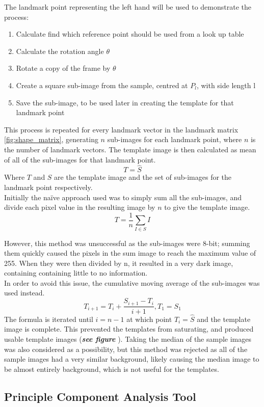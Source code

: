 \documentclass[a4paper, 12pt]{article}
\begin{document}
	The landmark point representing the left hand will be used to demonstrate the process:
	\begin{enumerate}
		\item Calculate find which reference point should be used from a look up table
		\item Calculate the rotation angle $\theta$
		\item Rotate a copy of the frame by $\theta$
		\item Create a square sub-image from the sample, centred at $P_l$, with side length l
		\item Save the sub-image, to be used later in creating the template for that landmark point
	\end{enumerate}
	This process is repeated for every landmark vector in the landmark matrix \ref{fig:shape_matrix}, generating $n$ sub-images
	for each landmark point, where $n$ is the number of landmark vectors.
	The template image is then calculated as mean of all of the sub-images for that landmark point.
	$$T = \hat{S}$$
 	Where $T$ and $S$ are the template image and the set of sub-images for the landmark point respectively.\\	
	Initially the naïve approach used was to simply sum all the sub-images, and divide each pixel value 
	in the resulting image by $n$ to give the template image.
	$$T = \frac{1}{n}\sum_{I \in S} I$$

	However, this method was unsuccessful as the sub-images were 8-bit; summing them quickly caused the pixels
	in the sum image to reach the maximum value of 255.
	When they were then divided by n, it resulted in a very dark image, containing containing little to no information.\\
	In order to avoid this issue, the cumulative moving average of the sub-images was used instead.
	$$T_{i+1} = T_i + \frac{S_{i+1} - T_i}{i+1}, T_1 = S_1$$
	The formula is iterated until $i = n-1$ at which point $T_i=\hat{S}$ and the template image is complete.
	This prevented the templates from saturating, and produced usable template images (\textbf{\emph{see figure }}).
	Taking the median of the sample images was also considered as a possibility, but this method
	was rejected as all of the sample images had a very similar background, likely causing
	the median image to be almost entirely background, which is not useful for the templates.
	\subsection{Principle Component Analysis Tool}
\end{document}
